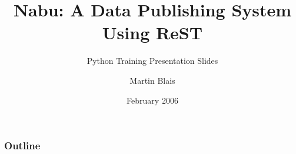 \documentclass[compress,trans]{beamer}
\title{Nabu: A Data Publishing System Using ReST}
\subtitle{Python Training Presentation Slides}
\author{Martin Blais}
\institute{Furius Enterprise}
\date{February 2006}
\begin{document}
\begin{frame}
  \titlepage
\end{frame}

\begin{frame}
  \frametitle{Outline}
  \tableofcontents
\end{frame}




% 
% 
% 
% 



% 
% 
% 
% 
% 
% 
% 
% 
% 
% 
% 
% 
% 
% 
% 
% 
% 
% 
% 
% 
% 
% 
% 
% 
% 
% 
% 
% 
% 
% 
% 
% 
% 
% 
% 
% 
% 
% 
% 
% 
% 
% 
\end{document}
